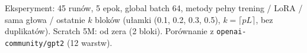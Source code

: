 Eksperyment: 45 runów, 5 epok, global batch 64, metody pełny trening / LoRA / sama głowa / ostatnie $k$ bloków (ułamki (0.1, 0.2, 0.3, 0.5), $k=\lceil pL\rceil$, bez duplikatów). Scratch 5M: od zera (2 bloki). Porównanie z \texttt{openai-community/gpt2} (12 warstw).
